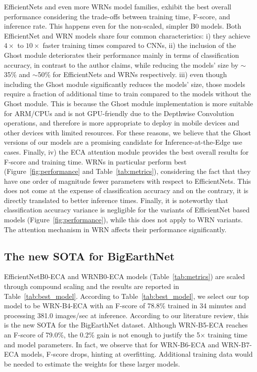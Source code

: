 \documentclass[journal]{IEEEtran}
\begin{document}
EfficientNets and even more WRNs model families, exhibit the best overall performance considering the trade-offs between training time, F-score, and inference rate. This happens even for the non-scaled, simpler B0 models. Both EfficientNet and WRN models share four common characteristics: i) they achieve $4\times$ to $10\times$ faster training times compared to CNNs, ii) the inclusion of the Ghost module deteriorates their performance mainly in terms of classification accuracy, in contrast to the author claims, while reducing the models' size by $\sim$35\% and $\sim$50\% for EfficientNets and WRNs respectively. iii) even though including the Ghost module significantly reduces the models' size, those models require a fraction of additional time to train compared to the models without the Ghost module. This is because the Ghost module implementation is more suitable for ARM/CPUs and is not GPU-friendly due to the Depthwise Convolution operations, and therefore is more appropriate to deploy in mobile devices and other devices with limited resources. For these reasons, we believe that the Ghost versions of our models are a promising candidate for Inference-at-the-Edge use cases. 
Finally, iv) the ECA attention module provides the best overall results for F-score and training time. WRNs in particular perform best (Figure~\ref{fig:performance} and Table~\ref{tab:metrics}), considering the fact that they have one order of magnitude fewer parameters with respect to EfficientNets. This does not come at the expense of classification accuracy and on the contrary, it is directly translated to better inference times. 
Finally, it is noteworthy that classification accuracy variance is negligible for the variants of EfficientNet based models (Figure~\ref{fig:performance}), while this does not apply to WRN variants. The attention mechanism in WRN affects their performance significantly. 

\subsection{The new SOTA for BigEarthNet}
EfficientNetB0-ECA and WRNB0-ECA models (Table~\ref{tab:metrics}) are scaled through compound scaling and the results are reported in Table~\ref{tab:best_model}. According to Table~\ref{tab:best_model}, we select our top model to be WRN-B4-ECA with an F-score of 78.8\% trained in 34 minutes and processing 381.0 images/sec at inference. According to our literature review, this is the new SOTA for the BigEarthNet dataset. Although WRN-B5-ECA reaches an F-score of 79.0\%, the 0.2\% gain is not enough to justify the 5$\times$ training time and model parameters. In fact, we observe that for WRN-B6-ECA and WRN-B7-ECA  models, F-score drops, hinting at overfitting. Additional training data would be needed to estimate the weights for these larger models. 
\end{document}
